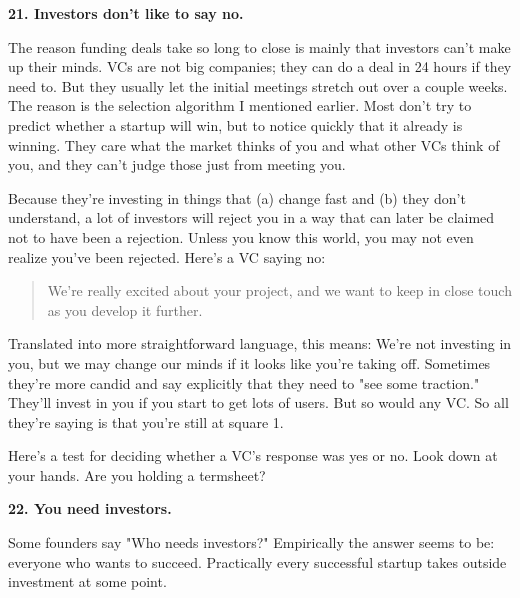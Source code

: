 \textbf{21. Investors don't like to say no.}

The reason funding deals take so long to close is
                  mainly that investors can't make up their minds. VCs are not
                  big companies; they can do a deal in 24 hours if they need to.
                  But they usually let the initial meetings stretch out over a
                  couple weeks. The reason is the selection algorithm I
                  mentioned earlier. Most don't try to predict whether a startup
                  will win, but to notice quickly that it already is winning.
                  They care what the market thinks of you and what other VCs
                  think of you, and they can't judge those just from meeting
                  you.

Because they're investing in things that (a)
                  change fast and (b) they don't understand, a lot of investors
                  will reject you in a way that can later be claimed not to have
                  been a rejection. Unless you know this world, you may not even
                  realize you've been rejected. Here's a VC saying no:
                  \begin{quote}

                    We're really excited about your project, and we want to keep
                    in close touch as you develop it further.
                  
\end{quote}

                  Translated into more straightforward language, this means:
                  We're not investing in you, but we may change our minds if it
                  looks like you're taking off. Sometimes they're more candid
                  and say explicitly that they need to "see some traction."
                  They'll invest in you if you start to get lots of users. But
                  so would any VC. So all they're saying is that you're still at
                  square 1.

Here's a test for deciding whether a VC's
                  response was yes or no. Look down at your hands. Are you
                  holding a termsheet?

\textbf{22. You need investors.}

Some founders say "Who needs investors?"
                  Empirically the answer seems to be: everyone who wants to
                  succeed. Practically every successful startup takes outside
                  investment at some point.

